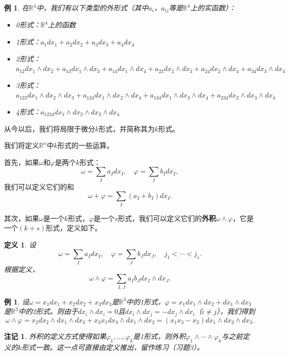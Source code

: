 \documentclass[12pt,a4paper]{ctexbook}
\newtheorem{definition}[theorem]{定义}
\newtheorem{remark}[theorem]{注记}
\newtheorem{example}[theorem]{例}
\begin{document}
\begin{example}
在$\mathbb{R}^4$中，我们有以下类型的外形式（其中$a_i$，$a_{ij}$等是$\mathbb{R}^4$上的实函数）：
\begin{itemize}
    \item 0形式：$\mathbb{R}^4$上的函数
    \item 1形式：$a_1dx_1 + a_2dx_2 + a_3dx_3 + a_4dx_4$
    \item 2形式：$a_{12}dx_1\wedge dx_2 + a_{13}dx_1\wedge dx_3 + a_{14}dx_1\wedge dx_4 + a_{23}dx_2\wedge dx_3 + a_{24}dx_2\wedge dx_4 + a_{34}dx_3\wedge dx_4$
    \item 3形式：$a_{123}dx_1\wedge dx_2\wedge dx_3 + a_{124}dx_1\wedge dx_2\wedge dx_4 + a_{134}dx_1\wedge dx_3\wedge dx_4 + a_{234}dx_2\wedge dx_3\wedge dx_4$
    \item 4形式：$a_{1234}dx_1\wedge dx_2\wedge dx_3\wedge dx_4$
\end{itemize}
\end{example}

从今以后，我们将局限于微分$k$形式，并简称其为$k$形式。

我们将定义$\mathbb{R}^n$中$k$形式的一些运算。

首先，如果$\omega$和$\varphi$是两个$k$形式：
$$\omega = \sum_I a_I dx_I,\quad \varphi = \sum_I b_I dx_I,$$
我们可以定义它们的和
$$\omega + \varphi = \sum_I (a_I + b_I) dx_I.$$

其次，如果$\omega$是一个$k$形式，$\varphi$是一个$s$形式，我们可以定义它们的\textbf{外积}$\omega\wedge\varphi$，它是一个$(k+s)$形式，定义如下。

\begin{definition}
设
$$\omega = \sum_I a_I dx_I,\quad \varphi = \sum_J b_J dx_J,\quad j_1<\cdots<j_s.$$
根据定义，
$$\omega\wedge\varphi = \sum_{I,J} a_I b_J dx_I\wedge dx_J.$$
\end{definition}

\begin{example}
设$\omega = x_1dx_1 + x_2dx_2 + x_3dx_3$是$\mathbb{R}^3$中的1形式，$\varphi = x_1dx_1\wedge dx_2 + dx_1\wedge dx_3$是$\mathbb{R}^3$中的2形式。则由于$dx_i\wedge dx_i=0$且$dx_i\wedge dx_j=-dx_j\wedge dx_i$（$i\neq j$），我们得到
$$\omega\wedge\varphi = x_2dx_2\wedge dx_1\wedge dx_3 + x_3x_1 dx_3\wedge dx_1\wedge dx_2 = (x_1x_3 - x_2)dx_1\wedge dx_2\wedge dx_3.$$
\end{example}

\begin{remark}
外积的定义方式使得如果$\varphi_1,\ldots,\varphi_k$是1形式，则外积$\varphi_1\wedge\cdots\wedge\varphi_k$与之前定义的$k$形式一致。这一点可直接由定义推出，留作练习（习题3）。
\end{remark}
\end{document}

